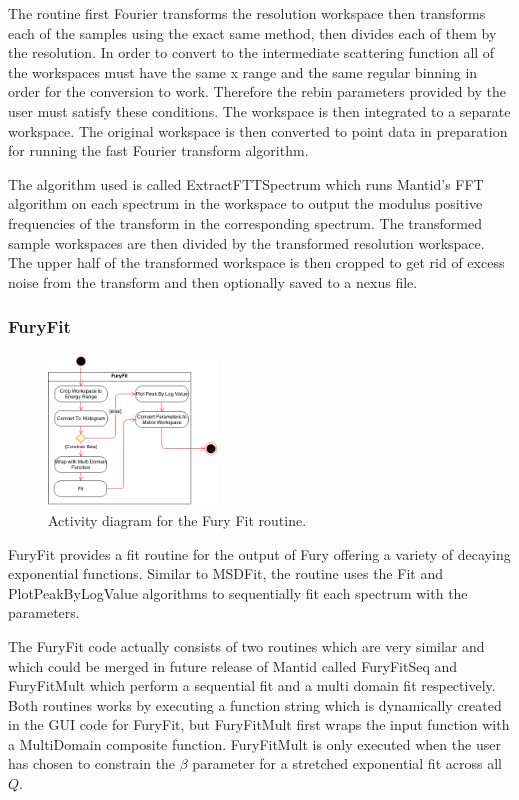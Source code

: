 \documentclass[paper=a4, fontsize=11pt]{scrartcl}	%
\numberwithin{equation}{section}															%
\numberwithin{figure}{section}																%
\numberwithin{table}{section}																%
\begin{document}
The routine first Fourier transforms the resolution workspace then transforms each of the samples using the exact same method,  then divides each of them by the resolution. In order to convert to the intermediate scattering function all of the workspaces must have the same x range and the same regular binning in order for the conversion to work. Therefore the rebin parameters provided by the user must satisfy these conditions. The workspace is then integrated to a separate workspace. The original workspace is then converted to point data in preparation for running the fast Fourier transform algorithm.

The algorithm used is called ExtractFTTSpectrum which runs Mantid's FFT algorithm on each spectrum in the workspace to output the modulus positive frequencies of the transform in the corresponding spectrum. The transformed sample workspaces are then divided by the transformed resolution workspace. The upper half of the transformed workspace is then cropped to get rid of excess noise from the transform and then optionally saved to a nexus file.

\subsubsection{FuryFit}

\begin{figure}[H]
\centering
\includegraphics[width=0.4\textwidth]{img/uml/activity_diagrams/FuryFit_activity.png}
\caption{Activity diagram for the Fury Fit routine.}
\label{fig:fury-fit-activity-diagram}
\end{figure}

FuryFit provides a fit routine for the output of Fury offering a variety of decaying exponential functions. Similar to MSDFit, the routine uses the Fit and PlotPeakByLogValue algorithms to sequentially fit each spectrum with the parameters.

The FuryFit code actually consists of two routines which are very similar and which could be merged in future release of Mantid called FuryFitSeq and FuryFitMult which perform a sequential fit and a multi domain fit respectively. Both routines works by executing a function string which is dynamically created in the GUI code for FuryFit, but FuryFitMult first wraps the input function with a MultiDomain composite function. FuryFitMult is only executed when the user has chosen to constrain the $\beta$ parameter for a stretched exponential fit across all $Q$.
\end{document}
